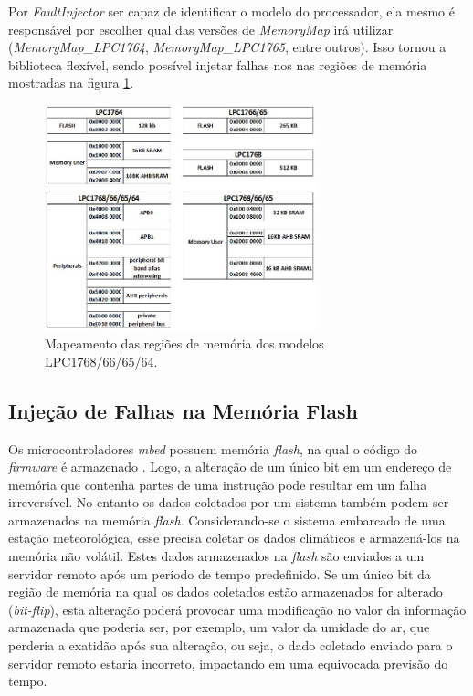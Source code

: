 Por \textit{FaultInjector} ser capaz de identificar o modelo do processador, ela mesmo é responsável por escolher qual das versões de \textit{MemoryMap} irá utilizar (\textit{MemoryMap\_LPC1764}, \textit{MemoryMap\_LPC1765}, entre outros). Isso tornou a biblioteca flexível, sendo possível injetar falhas nos nas regiões de memória mostradas na figura \ref{Img:memoryMap}.

\begin{figure}[H]
	\centering
	\includegraphics[width=0.7\textwidth]{figuras/memoryMap.jpg}
	\caption[Mapas das Regiões de Memória dos Modelos LPC1768/66/65/64]{Mapeamento das regiões de memória dos modelos LPC1768/66/65/64.}
	\label{Img:memoryMap}	
\end{figure}


\subsection{Injeção de Falhas na Memória Flash} \label{subsec:InjecaoFalhasFlash}

Os microcontroladores \textit{mbed} possuem memória \textit{flash}, na qual o código do \textit{firmware} é armazenado \cite{manualLpc176x:2016}. Logo, a alteração de um único bit em um endereço de memória que contenha partes de uma instrução pode resultar em um falha irreversível. No entanto os dados coletados por um sistema também podem ser armazenados na memória \textit{flash}. Considerando-se o sistema embarcado de uma estação meteorológica, esse precisa coletar os dados climáticos e armazená-los na memória não volátil. Estes dados armazenados na \textit{flash} são enviados a um servidor remoto após um período de tempo predefinido. Se um único bit da região de memória na qual os dados coletados estão armazenados for alterado (\textit{bit-flip}), esta alteração poderá provocar uma modificação no valor da informação armazenada que poderia ser, por exemplo, um valor da umidade do ar, que perderia a exatidão após sua alteração, ou seja, o dado coletado enviado para o servidor remoto estaria incorreto, impactando em uma equivocada previsão do tempo. 


